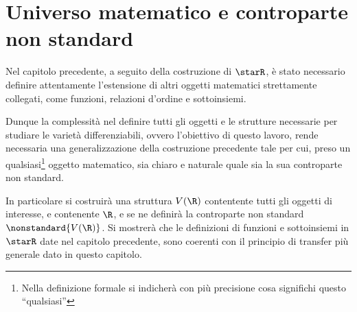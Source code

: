 \chapter{Universo matematico e controparte non standard}




Nel capitolo precedente, a seguito della costruzione di $ \starR $, è stato necessario definire attentamente l'estensione di altri oggetti matematici strettamente collegati, come funzioni, relazioni d'ordine e sottoinsiemi.

Dunque la complessità nel definire tutti gli oggetti e le strutture necessarie per studiare le varietà differenziabili, ovvero l'obiettivo di questo lavoro, rende necessaria una generalizzazione della costruzione precedente tale per cui, preso un qualsiasi\footnote{Nella definizione formale si indicherà con più precisione cosa significhi questo ``qualsiasi''} oggetto matematico, sia chiaro e naturale quale sia la sua controparte non standard.

In particolare si costruirà una struttura $ V(\R) $ contentente tutti gli oggetti di interesse, e contenente $ \R $, e se ne definirà la controparte non standard $ \nonstandard{V(\R)} $. Si mostrerà che le definizioni di funzioni e sottoinsiemi in $ \starR $ date nel capitolo precedente, sono coerenti con il principio di transfer più generale dato in questo capitolo. 

